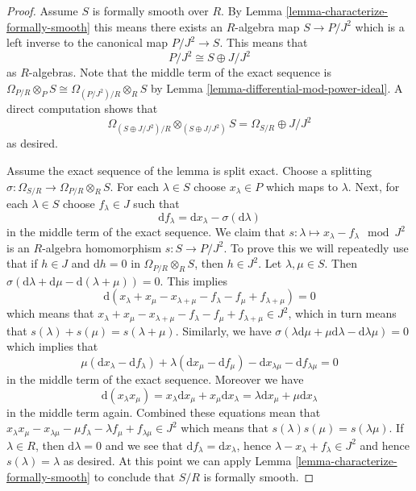 \begin{proof}
Assume $S$ is formally smooth over $R$. By
Lemma \ref{lemma-characterize-formally-smooth}
this means there exists an $R$-algebra map
$S \to P/J^2$ which is a left inverse to the
canonical map $P/J^2 \to S$. This means that
$$
P/J^2 \cong S \oplus J/J^2
$$
as $R$-algebras. Note that the middle term of the exact
sequence is $\Omega_{P/R} \otimes_P S \cong \Omega_{(P/J^2)/R} \otimes_R S$
by Lemma \ref{lemma-differential-mod-power-ideal}.
A direct computation shows that
$$
\Omega_{(S \oplus J/J^2)/R} \otimes_{(S \oplus J/J^2)} S =
\Omega_{S/R} \oplus J/J^2
$$
as desired.

\medskip\noindent
Assume the exact sequence of the lemma is split exact.
Choose a splitting $\sigma : \Omega_{S/R} \to \Omega_{P/R} \otimes_R S$.
For each $\lambda \in S$ choose $x_\lambda \in P$
which maps to $\lambda$. Next, for each $\lambda \in S$ choose
$f_\lambda \in J$ such that
$$
\text{d}f_\lambda = \text{d}x_\lambda - \sigma(\text{d}\lambda)
$$
in the middle term of the exact sequence.
We claim that $s : \lambda \mapsto x_\lambda - f_\lambda \mod J^2$
is an $R$-algebra homomorphism $s : S \to P/J^2$.
To prove this we will repeatedly use that if $h \in J$ and
$\text{d}h = 0$ in $\Omega_{P/R} \otimes_R S$, then $h \in J^2$.
Let $\lambda, \mu \in S$.
Then $\sigma(\text{d}\lambda + \text{d}\mu - \text{d}(\lambda + \mu)) = 0$.
This implies
$$
\text{d}(x_\lambda + x_\mu - x_{\lambda + \mu}
- f_\lambda - f_\mu + f_{\lambda + \mu}) = 0
$$
which means that $x_\lambda + x_\mu - x_{\lambda + \mu}
- f_\lambda - f_\mu + f_{\lambda + \mu} \in J^2$, which in turn
means that $s(\lambda) + s(\mu) = s(\lambda + \mu)$. 
Similarly, we have
$\sigma(\lambda \text{d}\mu + \mu \text{d}\lambda - \text{d}\lambda \mu) = 0$
which implies that
$$
\mu(\text{d}x_\lambda - \text{d}f_\lambda) +
\lambda(\text{d}x_\mu - \text{d}f_\mu) -
\text{d}x_{\lambda\mu} - \text{d}f_{\lambda\mu} = 0
$$
in the middle term of the exact sequence.
Moreover we have
$$
\text{d}(x_\lambda x_\mu) =
x_\lambda \text{d}x_\mu + x_\mu \text{d}x_\lambda =
\lambda \text{d}x_\mu + \mu \text{d} x_\lambda
$$
in the middle term again. Combined these equations mean that
$x_\lambda x_\mu - x_{\lambda\mu}
- \mu f_\lambda - \lambda f_\mu + f_{\lambda\mu} \in J^2$
which means that $s(\lambda)s(\mu) = s(\lambda\mu)$.
If $\lambda \in R$, then $\text{d}\lambda = 0$ and we see
that $\text{d}f_\lambda = \text{d}x_\lambda$, hence
$\lambda - x_\lambda + f_\lambda \in J^2$ and hence
$s(\lambda) = \lambda$ as desired. At this point we can
apply Lemma \ref{lemma-characterize-formally-smooth}
to conclude that $S/R$ is formally smooth.
\end{proof}

